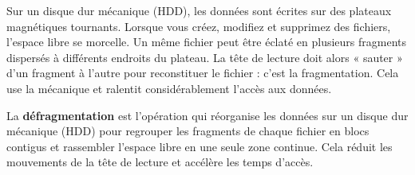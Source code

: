 \documentclass[11pt]{article}
\newcommand{\cle}[1]{{\popxbold\color{popdark}#1}}
\begin{document}
Sur un disque dur mécanique (HDD), les données sont écrites sur des plateaux magnétiques tournants. Lorsque vous créez, modifiez et supprimez des fichiers, l'espace libre se morcelle. Un même fichier peut être éclaté en plusieurs \cle{fragments} dispersés à différents endroits du plateau. La tête de lecture doit alors « sauter » d'un fragment à l'autre pour reconstituer le fichier : c'est la \cle{fragmentation}. Cela use la mécanique et ralentit considérablement l'accès aux données.

\begin{definition}[Défragmentation]
La \textbf{défragmentation} est l'opération qui réorganise les données sur un disque dur mécanique (HDD) pour regrouper les fragments de chaque fichier en blocs contigus et rassembler l'espace libre en une seule zone continue. Cela réduit les mouvements de la tête de lecture et accélère les temps d'accès.
\end{definition}
\end{document}
